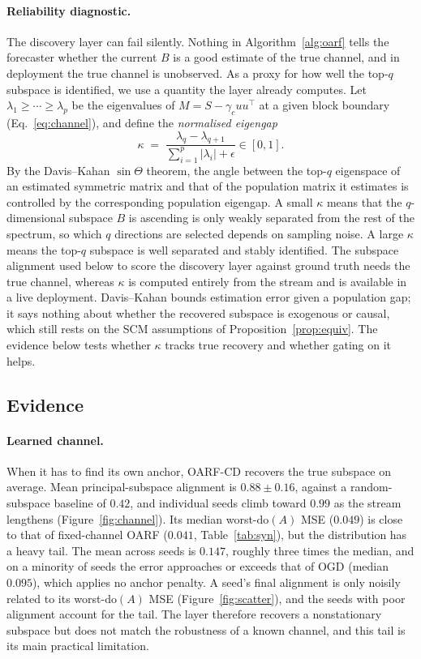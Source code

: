 \documentclass[12pt]{article}
\theoremstyle{plain}
\theoremstyle{remark}
\newcommand{\doop}{\mathrm{do}}
\newcommand{\OARF}{\textsc{OARF}}
\newcommand{\OARFCD}{\textsc{OARF-CD}}
\begin{document}
\paragraph{Reliability diagnostic.} The discovery layer can fail silently. Nothing in
Algorithm~\ref{alg:oarf} tells the forecaster whether the current $B$ is a good
estimate of the true channel, and in deployment the true channel is unobserved. As a
proxy for how well the top-$q$ subspace is identified, we use a quantity the layer
already computes. Let $\lambda_1\ge\cdots\ge\lambda_p$ be the eigenvalues of
$M=S-\gamma_c uu^\top$ at a given block boundary (Eq.~\eqref{eq:channel}), and define
the \emph{normalised eigengap}
\begin{equation}\label{eq:eigengap}
 \kappa \;=\; \frac{\lambda_q-\lambda_{q+1}}{\sum_{i=1}^p|\lambda_i|+\epsilon}\in[0,1].
\end{equation}
By the Davis--Kahan $\sin\Theta$ theorem, the angle between the top-$q$ eigenspace of
an estimated symmetric matrix and that of the population matrix it estimates is
controlled by the corresponding population eigengap. A small $\kappa$ means that the $q$-dimensional subspace $B$ is ascending is only weakly separated from
the rest of the spectrum, so which $q$ directions are selected depends on sampling
noise. A large $\kappa$ means the top-$q$ subspace is well separated and stably
identified. The subspace alignment used below to score the discovery layer against ground
truth needs the true channel, whereas $\kappa$ is
computed entirely from the stream and is available in a live deployment.
Davis--Kahan bounds estimation error given a population gap; it says nothing about
whether the recovered subspace is exogenous or causal, which still rests on the SCM
assumptions of Proposition~\ref{prop:equiv}. The evidence below tests whether
$\kappa$ tracks true recovery and whether gating on it helps.

\subsection{Evidence}

\paragraph{Learned channel.}
When it has to find its own anchor, \OARFCD{} recovers the true subspace on average. Mean
principal-subspace alignment is $0.88\pm0.16$, against a random-subspace baseline of
$0.42$, and individual seeds climb toward $0.99$ as the stream lengthens
(Figure~\ref{fig:channel}). Its median worst-$\doop(A)$ MSE ($0.049$) is close to that of
fixed-channel \OARF{} ($0.041$, Table~\ref{tab:syn}), but the distribution has a heavy
tail. The mean across seeds is $0.147$, roughly three times the median, and on a minority
of seeds the error approaches or exceeds that of OGD (median $0.095$), which applies no
anchor penalty. A seed's final alignment is only noisily related to its worst-$\doop(A)$
MSE (Figure~\ref{fig:scatter}), and the seeds with poor alignment account for the tail.
The layer therefore recovers a nonstationary subspace but does not match the
robustness of a known channel, and this tail is its main practical limitation.
\end{document}
